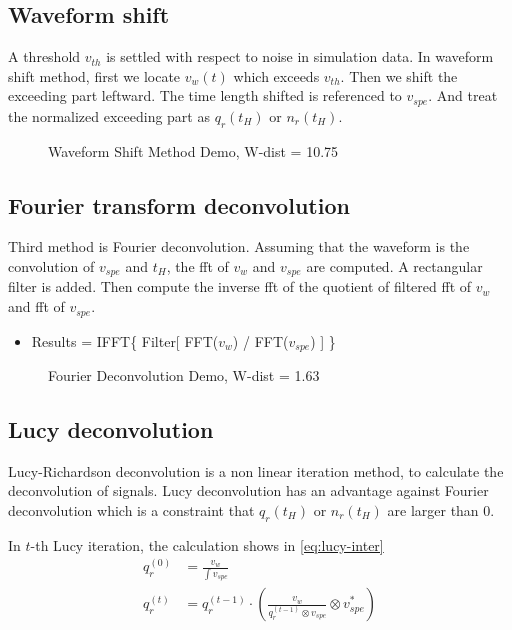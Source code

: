 \subsection{Waveform shift}
A threshold $v_{th}$ is settled with respect to noise in simulation data. In waveform shift method, first we locate $v_{w}(t)$ which exceeds $v_{th}$. Then we shift the exceeding part leftward. The time length shifted is referenced to $v_{spe}$. And treat the normalized exceeding part as $q_{r}(t_{H})$ or $n_{r}(t_{H})$. 

\begin{figure}[H]
    \centering
    \scalebox{0.4}{}
    \caption{Waveform Shift Method Demo, W-dist = 10.75}
\end{figure}

\subsection{Fourier transform deconvolution}
Third method is Fourier deconvolution. Assuming that the waveform is the convolution of $v_{spe}$ and $t_{H}$, the fft of $v_{w}$ and $v_{spe}$ are computed. A rectangular filter is added. Then compute the inverse fft of the quotient of filtered fft of $v_{w}$ and fft of $v_{spe}$. 

\begin{itemize}
    \item Results = IFFT\{ Filter[ FFT($v_{w}$) / FFT($v_{spe}$) ] \}
\end{itemize}

\begin{figure}[H]
    \centering
    \scalebox{0.4}{}
    \caption{Fourier Deconvolution Demo, W-dist = 1.63}
\end{figure}

\subsection{Lucy deconvolution}
Lucy-Richardson deconvolution is a non linear iteration method, to calculate the deconvolution of signals. Lucy deconvolution has an advantage against Fourier deconvolution which is a constraint that $q_{r}(t_{H})$ or $n_{r}(t_{H})$ are larger than 0. 

In $t$-th Lucy iteration, the calculation shows in \eqref{eq:lucy-inter}
\begin{align}
    q_{r}^{(0)} &= \frac{v_{w}}{\int v_{spe}} \\
    q_{r}^{(t)} &= q_{r}^{(t-1)} \cdot \left(\frac{v_{w}}{q_{r}^{(t-1)} \otimes v_{spe}} \otimes v^{*}_{spe}\right)
    \label{eq:lucy-inter}
\end{align}

